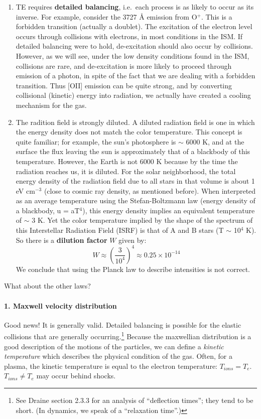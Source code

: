 \documentclass[11pt]{article}
\newcommand{\mar}[1]{\hspace{0pt}\marginpar{-\textcolor{black}{#1}-}}
\begin{document}
\begin{enumerate}
    \item TE requires \textbf{detailed balancing},
        i.e.\ each process is as likely to occur as its inverse. For
        example, consider the 3727 \AA{} emission from O$^{+}$. This is a
        forbidden transition (actually a doublet). The excitation of the
        electron level occurs through collisions with electrons, in most
        conditions in the ISM\@. If detailed balancing were to hold,
        de-excitation should also occur by collisions. However, as we will
        see, under the low density conditions found in the ISM, collisions
        are rare, and de-excitation is more likely to proceed through
        emission of a photon, in spite of the fact that we are dealing with
        a forbidden transition. Thus [OII] emission can be quite strong,
        and by converting collisional (kinetic) energy into radiation, we
        actually have created a cooling mechanism for the gas.
    \item The radition field is strongly diluted. A diluted radiation field
        is one in which the energy density does not match the color
        temperature. This concept is quite familiar; for example, the sun's
        photosphere is $\sim$ 6000 K, and at the surface the flux leaving
        the sun is approximately that of a blackbody of this temperature.
        However, the Earth is not 6000 K because by the time the radiation
        reaches us, it is diluted. \mar{20}For the solar neighborhood, the
        total energy density of the radiation field due to all stars in
        that volume is about 1 eV cm$^{-3}$ (close to cosmic ray density,
        as mentioned before). When interpreted as an average temperature
        using the Stefan-Boltzmann law (energy density of a blackbody, u =
        aT$^{4}$), this energy density implies an equivalent temperature of
        $\sim$ 3 K. Yet the color temperature implied by the shape of the
        spectrum of this Interstellar Radiation Field (ISRF) is that of A
        and B stars (T $\sim$ 10$^{4}$ K). So there is a \textbf{dilution
        factor} $W$ given by:
        \[
            W \approx \left( \frac{3}{10^{4}} \right) ^{4}
              \approx 0.25\times10^{-14}
            \]
        We conclude that using the Planck law to
        describe intensities is not correct.
\end{enumerate}
What about the other laws?

\paragraph{1. Maxwell velocity distribution} Good news! It is generally
valid. Detailed balancing is possible for the elastic collisions that are
generally occurring.\footnote{
    See Draine section 2.3.3 for an analysis of ``deflection times''; they
    tend to be short. (In dynamics, we speak of a ``relaxation time''.)}
Because the maxwellian distribution is a good
description of the motions of the particles, we can define a \textit{kinetic
temperature} which describes the physical condition of the gas. Often,
for a plasma, the kinetic temperature is equal to the electron temperature:
$T_{ions} = T_{e}$. $T_{ions} \neq T_{e}$ may occur behind shocks.
\end{document}
